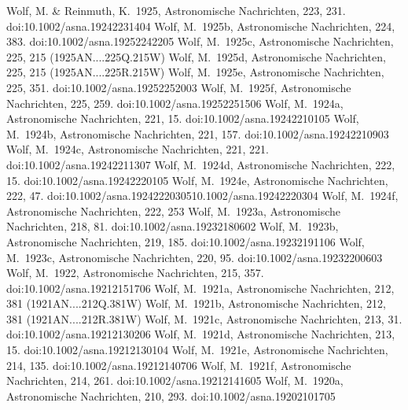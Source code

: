 \documentclass[twocolumn,tighten,twocolappendix]{aastex631}
\begin{document}
\begin{thebibliography}{}
 Wolf, M. \& Reinmuth, K.\ 1925, Astronomische Nachrichten, 223, 231. doi:10.1002/asna.19242231404
 Wolf, M.\ 1925b, Astronomische Nachrichten, 224, 383. doi:10.1002/asna.19252242205
 Wolf, M.\ 1925c, Astronomische Nachrichten, 225, 215 (1925AN....225Q.215W)
 Wolf, M.\ 1925d, Astronomische Nachrichten, 225, 215 (1925AN....225R.215W)
 Wolf, M.\ 1925e, Astronomische Nachrichten, 225, 351. doi:10.1002/asna.19252252003
 Wolf, M.\ 1925f, Astronomische Nachrichten, 225, 259. doi:10.1002/asna.19252251506
 Wolf, M.\ 1924a, Astronomische Nachrichten, 221, 15. doi:10.1002/asna.19242210105
 Wolf, M.\ 1924b, Astronomische Nachrichten, 221, 157. doi:10.1002/asna.19242210903
 Wolf, M.\ 1924c, Astronomische Nachrichten, 221, 221. doi:10.1002/asna.19242211307
 Wolf, M.\ 1924d, Astronomische Nachrichten, 222, 15. doi:10.1002/asna.19242220105
 Wolf, M.\ 1924e, Astronomische Nachrichten, 222, 47. doi:10.1002/asna.1924222030510.1002/asna.19242220304
 Wolf, M.\ 1924f, Astronomische Nachrichten, 222, 253
 Wolf, M.\ 1923a, Astronomische Nachrichten, 218, 81. doi:10.1002/asna.19232180602
 Wolf, M.\ 1923b, Astronomische Nachrichten, 219, 185. doi:10.1002/asna.19232191106
 Wolf, M.\ 1923c, Astronomische Nachrichten, 220, 95. doi:10.1002/asna.19232200603
 Wolf, M.\ 1922, Astronomische Nachrichten, 215, 357. doi:10.1002/asna.19212151706
 Wolf, M.\ 1921a, Astronomische Nachrichten, 212, 381 (1921AN....212Q.381W)
 Wolf, M.\ 1921b, Astronomische Nachrichten, 212, 381 (1921AN....212R.381W)
 Wolf, M.\ 1921c, Astronomische Nachrichten, 213, 31. doi:10.1002/asna.19212130206
 Wolf, M.\ 1921d, Astronomische Nachrichten, 213, 15. doi:10.1002/asna.19212130104
 Wolf, M.\ 1921e, Astronomische Nachrichten, 214, 135. doi:10.1002/asna.19212140706
 Wolf, M.\ 1921f, Astronomische Nachrichten, 214, 261. doi:10.1002/asna.19212141605
 Wolf, M.\ 1920a, Astronomische Nachrichten, 210, 293. doi:10.1002/asna.19202101705

\end{thebibliography}
\end{document}
